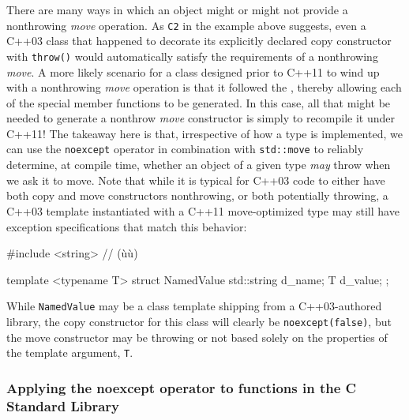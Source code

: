 \noindent There are many ways in which an object might or might not provide a
nonthrowing \emph{move} operation. As \lstinline!C2! in the example above
suggests, even a C++03 class that happened to decorate its explicitly
declared copy constructor with \lstinline!throw()! would automatically
satisfy the requirements of a nonthrowing \emph{move}. A more likely
scenario for a class designed prior to C++11 to wind up with a
nonthrowing \emph{move} operation is that it followed the , thereby allowing each of the special member functions to be
generated. In this case, all that might be needed to generate a nonthrow
\emph{move} constructor is simply to recompile it under C++11! The
takeaway here is that, irrespective of how a type is implemented, we can
use the \lstinline!noexcept! operator in combination with
\lstinline!std::move! to reliably determine, at compile time, whether an
object of a given type \emph{may} throw when we ask it to move. Note
that while it is typical for C++03 code to either have both copy and
move constructors nonthrowing, or both potentially throwing, a C++03
template instantiated with a C++11 move-optimized type may still have
exception specifications that match this behavior:

\begin{emcppshiddenlisting}[emcppsbatch=e13]
#include <string>  // (ù{}ù)
\end{emcppshiddenlisting}
\begin{emcppslisting}[emcppsbatch=e13]
template <typename T>
struct NamedValue
{
    std::string d_name;
    T           d_value;
};
\end{emcppslisting}
    

\noindent While \lstinline!NamedValue! may be a class template shipping from a
C++03-authored library, the copy constructor for this class will clearly
be \lstinline!noexcept(false)!, but the move constructor may be throwing or
not based solely on the properties of the template argument, \lstinline!T!.

\subsubsection[Applying the \lstinline!noexcept! operator to functions in the C Standard Library]{Applying the {\SubsubsecCode noexcept} operator to functions in the C Standard Library}\label{applying-the-noexcept-operator-to-functions-in-the-c-standard-library}


